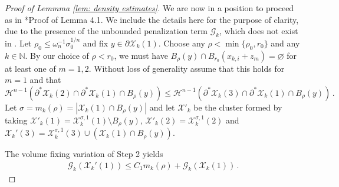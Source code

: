 \documentclass[10pt,reqno]{amsart}
\numberwithin{equation}{section}
\theoremstyle{definition}
\newcommand{\Hcal}{\mathcal{H}}
\newcommand{\cG}{\mathcal{G}}
\newcommand{\X}{\mathcal{X}}
\begin{document}
{\begin{proof}[Proof of Lemmma \ref{lem: density estimates}]
We are now in a position to proceed as in \cite{BroNov24}*{Proof of Lemma 4.1}. We include the details here for the purpose of clarity, due to the presence of the unbounded penalization term $\cG_k$, which does not exist in \cite{BroNov24}. Let $\rho_0 \leq \omega_n^{-1}\sigma_0^{1/n}$ and fix $y\in \partial \X_k(1)$.  Choose any $\rho <\min\{\rho_0,r_0\}$ and any $k\in \mathbb{N}$. {By our choice of $\rho<r_0$, we must have $B_\rho(y) \cap B_{r_0}(x_{k,i}+z_m)=\varnothing$ for at least one of $m=1,2$.}
Without loss of generality assume {that this holds for $m=1$ and that}
\begin{equation}\label{e:larger-unbdd-chamber}
	\Hcal^{n-1}(\partial^*\X_k(2)\cap \partial^*\X_k(1)\cap B_{\rho}(y)) \leq \Hcal^{n-1}(\partial^*\X_k(3)\cap \partial^*\X_k(1)\cap B_{\rho}(y))\,.
\end{equation}
Let $\sigma {=m_k(\rho)} = |\X_k(1) \cap B_{\rho}(y)|$ and let $\X'_k$ be the cluster formed by taking $\X'_k(1) = \X_k^{\sigma,1}(1) \setminus B_\rho(y)$, $\X'_k(2) = \X_k^{\sigma,1}(2)$ and $\X_k'(3) = \X_k^{\sigma,1}(3) \cup (\X_k(1)\cap B_\rho(y))$. 
% 
%


The volume fixing variation of Step 2 yields
\begin{align}\label{eq:pot estimate}
    \cG_k(\X_k'(1)) \leq C_1 m_k(\rho) + \cG_k(\X_k(1))\,.
\end{align}


\end{proof}}
\end{document}
